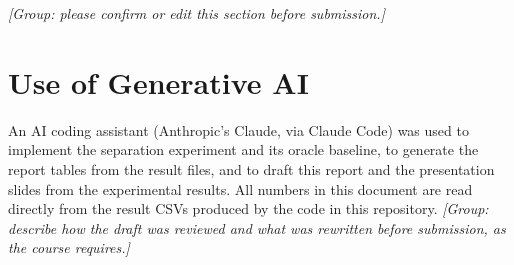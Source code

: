 \documentclass[11pt,letterpaper]{article}
\begin{document}
\noindent\textit{[Group: please confirm or edit this section before submission.]}

\section*{Use of Generative AI}

An AI coding assistant (Anthropic's Claude, via Claude Code) was used to
implement the separation experiment and its oracle baseline, to generate the
report tables from the result files, and to draft this report and the
presentation slides from the experimental results. All numbers in this
document are read directly from the result CSVs produced by the code in this
repository. \textit{[Group: describe how the draft was reviewed and what was
rewritten before submission, as the course requires.]}



\end{document}
